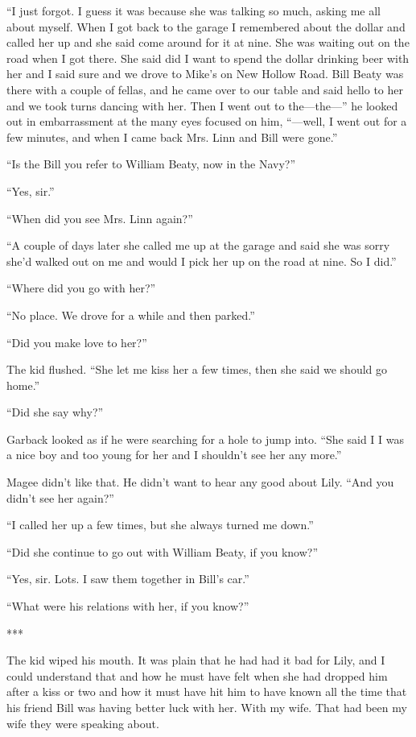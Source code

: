 \documentclass{novel}
\begin{document}
{“I just forgot. I guess it was because she was talking so much, asking me all about myself. When I got back to the garage I remembered about the dollar and called her up and she said come around for it at nine. She was waiting out on the road when I got there. She said did I want to spend the dollar drinking beer with her and I said sure and we drove to Mike’s on New Hollow Road. Bill Beaty was there with a couple of fellas, and he came over to our table and said hello to her and we took turns dancing with her. Then I went out to the—the—” he looked out in embarrassment at the many eyes focused on him, “—well, I went out for a few minutes, and when I came back Mrs. Linn and Bill were gone.”

“Is the Bill you refer to William Beaty, now in the Navy?”

“Yes, sir.”

“When did you see Mrs. Linn again?”

“A couple of days later she called me up at the garage and said she was sorry she’d walked out on me and would I pick her up on the road at nine. So I did.”

“Where did you go with her?”

“No place. We drove for a while and then parked.”

“Did you make love to her?”

The kid flushed. “She let me kiss her a few times, then she said we should go home.”

“Did she say why?”

Garback looked as if he were searching for a hole to jump into. “She said I I was a nice boy and too young for her and I shouldn’t see her any more.”

Magee didn’t like that. He didn’t want to hear any good about Lily. “And you didn’t see her again?”

“I called her up a few times, but she always turned me down.”

“Did she continue to go out with William Beaty, if you know?”

“Yes, sir. Lots. I saw them together in Bill’s car.”

“What were his relations with her, if you know?”

***

The kid wiped his mouth. It was plain that he had had it bad for Lily, and I could understand that and how he must have felt when she had dropped him after a kiss or two and how it must have hit him to have known all the time that his friend Bill was having better luck with her. With my wife. That had been my wife they were speaking about.

}
\end{document}
